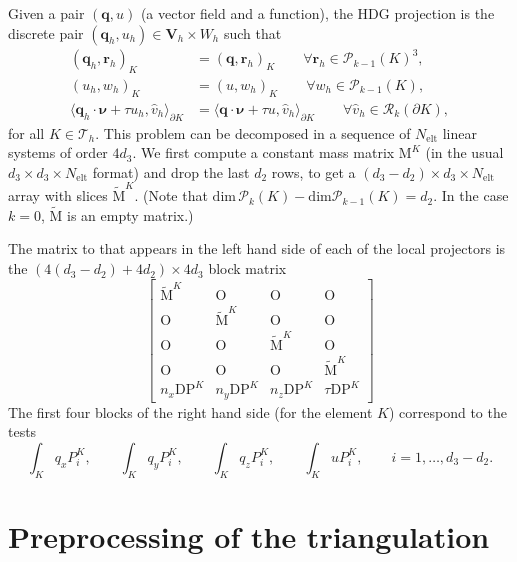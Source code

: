 \documentclass[10pt,english]{article}
\newcommand{\Nelt}{{N_{\mathrm{elt}}}}
\begin{document}
Given a pair $(\boldsymbol q,u)$ (a vector field and a function), the HDG projection is the discrete pair $(\boldsymbol q_h,u_h)\in \boldsymbol V_h\times W_h$ such that
\[
\begin{array}{rl}
(\boldsymbol q_h,\boldsymbol r_h)_K &=(\boldsymbol q,\boldsymbol r_h)_K \qquad \forall \boldsymbol r_h \in \mathcal P_{k-1}(K)^3,\\
(u_h,w_h)_K &=(u,w_h)_K \qquad \forall w_h \in \mathcal P_{k-1}(K),\\
\langle \boldsymbol q_h\cdot\boldsymbol\nu+\tau u_h,\widehat v_h\rangle_{\partial K}&=
\langle \boldsymbol q\cdot\boldsymbol\nu+\tau u,\widehat v_h\rangle_{\partial K}\qquad \forall \widehat v_h \in \mathcal R_k(\partial K),
\end{array}
\]
for all $K\in \mathcal T_h$. This problem can be decomposed in a sequence of $\Nelt$ linear systems of order $4d_3$. We first compute a constant mass matrix $\mathrm M^K$ (in the usual $d_3\times d_3\times \Nelt$ format) and drop the last $d_2$ rows, to get a $(d_3-d_2)\times d_3\times \Nelt$ array with slices $\widetilde{\mathrm M}^K$. (Note that $\mathrm{dim}\,\mathcal P_k(K)-\mathrm{dim}\mathcal P_{k-1}(K)=d_2$. In the case $k=0$, $\widetilde{\mathrm M}$ is an empty matrix.)

The matrix to that appears in the left hand side of each of the local projectors is the $(4(d_3-d_2)+4d_2)\times 4d_3$ block matrix
\[
\left[\begin{array}{cccc} \widetilde{\mathrm M}^K & \mathrm O & \mathrm O & \mathrm O\\[1.5ex]
\mathrm O & \widetilde{\mathrm M}^K & \mathrm O & \mathrm O\\[1.5ex]
\mathrm O & \mathrm O & \widetilde{\mathrm M}^K & \mathrm O\\[1.5ex]
\mathrm O & \mathrm O & \mathrm O & \widetilde{\mathrm M}^K\\[1.5ex]
n_x\mathrm{DP}^K &  n_y\mathrm{DP}^K & n_z\mathrm{DP}^K & \tau\mathrm{DP}^K
\end{array}\right]
\]
The first four blocks of the right hand side (for the element $K$) correspond to the tests
\[
\int_K q_x P_i^K, \qquad\int_K q_y P_i^K, \qquad\int_K q_z P_i^K, \qquad\int_K u P_i^K, \qquad i=1,\ldots,d_3-d_2.
\]







\section{Preprocessing of the triangulation}
\end{document}
